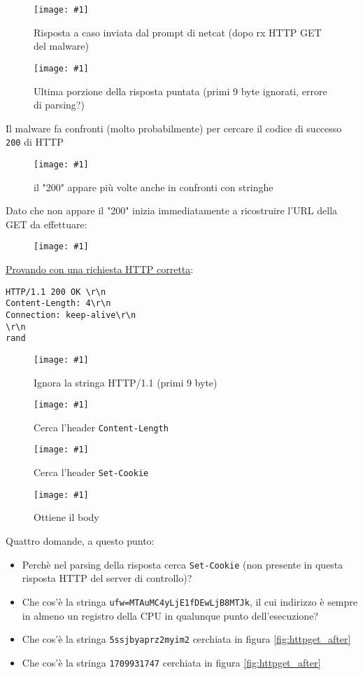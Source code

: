\documentclass[
    a4paper, %
    11pt %
]{article}
\newcommand{\pic}[4]{\begin{figure}[H]
            \centering
            \texttt{[image: \#1]}
            \caption{#2}
            \label{fig:#1}
            \end{figure}}
\begin{document}
            \pic{brkp_after_recv_ans}{Risposta a caso inviata dal prompt di netcat (dopo rx HTTP GET del malware)}{10cm}{5cm}

            \pic{brkp_after_recv_ans_part}{Ultima porzione della risposta puntata (primi 9 byte ignorati, errore di parsing?)}{14cm}{2.5cm}

            \pagebreak
            
            Il malware fa confronti (molto probabilmente) per cercare il codice di successo \texttt{200} di HTTP

            \pic{parse_200_hard}{il "200" appare più volte anche in confronti con stringhe}{14cm}{4cm}

            Dato che non appare il "200" inizia immediatamente a ricostruire l'URL della GET da effettuare:

            \pic{build_req_path}{}{15cm}{3cm}

            \underline{Provando con una richiesta HTTP corretta}:

            \begin{lstlisting}
HTTP/1.1 200 OK \r\n
Content-Length: 4\r\n
Connection: keep-alive\r\n
\r\n
rand
            \end{lstlisting}

            \pic{parse_ok}{Ignora la stringa HTTP/1.1 (primi 9 byte)}{13cm}{2cm}

            \pic{parse_contentlength}{Cerca l'header \texttt{Content-Length}}{13cm}{2cm}

            \pic{parse_setcookie}{Cerca l'header \texttt{Set-Cookie}}{19cm}{6cm}

            \pic{parse_body}{Ottiene il body}{12cm}{2cm}

            Quattro domande, a questo punto:
            \begin{itemize}
                \item Perchè nel parsing della risposta cerca \texttt{Set-Cookie} (non presente in questa risposta HTTP del server di controllo)?
                \item Che cos'è la stringa \texttt{ufw=MTAuMC4yLjE1fDEwLjB8MTJk}, il cui indirizzo è sempre
                    in almeno un registro della CPU in qualunque punto dell'esecuzione?
                \item Che cos'è la stringa \texttt{5ssjbyaprz2myim2} cerchiata in figura \ref{fig:httpget_after}
                \item Che cos'è la stringa \texttt{1709931747} cerchiata in figura \ref{fig:httpget_after}
            \end{itemize}
\end{document}

